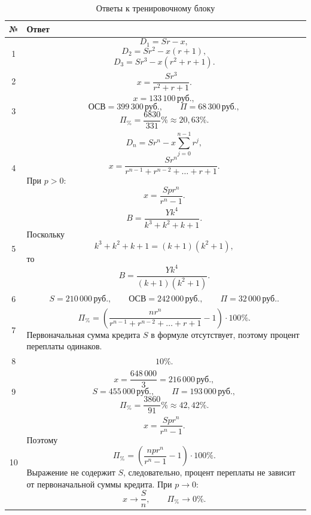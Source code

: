 \documentclass[a4paper,12pt]{article}
\newcommand{\rub}{\,\text{руб.}}
\begin{document}
\begin{table}[ht]
  \centering
  \caption{Ответы к тренировочному блоку}
  \renewcommand{\arraystretch}{1.55}
  \small
  \begin{tabularx}{\linewidth}{
    @{}
    c
    >{\raggedright\arraybackslash}X
    @{}
  }
    \toprule
    \textbf{№} & \textbf{Ответ} \\
    \midrule

    1 &
    \[
    D_1=Sr-x,
    \]
    \[
    D_2=Sr^2-x(r+1),
    \]
    \[
    D_3=Sr^3-x(r^2+r+1).
    \]
    \\

    2 &
    \[
    \boxed{x=\frac{Sr^3}{r^2+r+1}}.
    \]
    \\

    3 &
    \[
    x=133\,100\rub,
    \]
    \[
    \text{ОСВ}=399\,300\rub,
    \qquad
    \Pi=68\,300\rub,
    \]
    \[
    \Pi_{\%}
    =
    \frac{6830}{331}\%
    \approx20{,}63\%.
    \]
    \\

    4 &
    \[
    D_n
    =
    Sr^n-x\sum_{j=0}^{n-1}r^j,
    \]
    \[
    \boxed{
    x=
    \frac{Sr^n}
    {r^{n-1}+r^{n-2}+\dots+r+1}
    }.
    \]
    При \(p>0\):
    \[
    \boxed{x=\frac{Spr^n}{r^n-1}}.
    \]
    \\

    5 &
    \[
    \boxed{
    B=\frac{Yk^4}{k^3+k^2+k+1}
    }.
    \]
    Поскольку
    \[
    k^3+k^2+k+1=(k+1)(k^2+1),
    \]
    то
    \[
    \boxed{
    B=\frac{Yk^4}{(k+1)(k^2+1)}
    }.
    \]
    \\

    6 &
    \[
    S=210\,000\rub,
    \qquad
    \text{ОСВ}=242\,000\rub,
    \qquad
    \Pi=32\,000\rub.
    \]
    \\

    7 &
    \[
    \Pi_{\%}
    =
    \left(
    \frac{nr^n}
    {r^{n-1}+r^{n-2}+\dots+r+1}
    -1
    \right)\cdot100\%.
    \]
    Первоначальная сумма кредита \(S\) в формуле отсутствует, поэтому
    процент переплаты одинаков.
    \\

    8 &
    \[
    \boxed{10\%}.
    \]
    \\

    9 &
    \[
    x=\frac{648\,000}{3}=216\,000\rub,
    \]
    \[
    S=455\,000\rub,
    \qquad
    \Pi=193\,000\rub,
    \]
    \[
    \Pi_{\%}
    =
    \frac{3860}{91}\%
    \approx42{,}42\%.
    \]
    \\

    10 &
    \[
    x=\frac{Spr^n}{r^n-1}.
    \]
    Поэтому
    \[
    \boxed{
    \Pi_{\%}
    =
    \left(
    \frac{npr^n}{r^n-1}-1
    \right)\cdot100\%
    }.
    \]
    Выражение не содержит \(S\), следовательно, процент переплаты не
    зависит от первоначальной суммы кредита. При \(p\to0\):
    \[
    x\to\frac{S}{n},
    \qquad
    \Pi_{\%}\to0\%.
    \]
    \\

    \bottomrule
  \end{tabularx}
\end{table}
\end{document}
